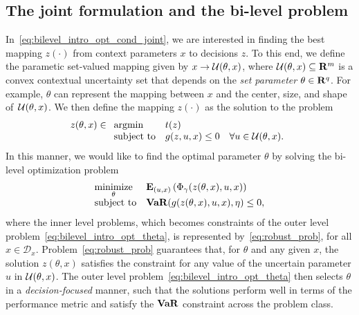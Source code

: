 \subsection{The joint formulation and the bi-level problem}
\label{sec:joint}
In~\eqref{eq:bilevel_intro_opt_cond_joint}, we are interested in finding the best mapping $z(\cdot)$ from context parameters $x$ to decisions $z$. To this end, we define the parametic set-valued mapping given by $x \rightarrow {\mathcal{U}}(\theta,x)$, where 
${\mathcal{U}}(\theta,x) \subseteq {\mathbf R}^m$ is a convex contextual uncertainty set that depends on the {\it set parameter} $\theta \in {\mathbf R}^q$.
For example, $\theta$ can represent the mapping between $x$ and the center, size, and shape of~${\mathcal{U}}(\theta,x)$.
We then define the mapping $z(\cdot)$ as the solution to the  problem
\begin{equation}
	\label{eq:robust_prob}
	z(\theta, x) \in \begin{array}[t]{ll}
		\mbox{argmin}  &t(z)\\
		\mbox{subject to} & g(z,u,x)  \le 0  \quad \forall u \in {\mathcal{U}}(\theta,x).
	\end{array}
\end{equation}
In this manner, we would like to find the optimal parameter $\theta$ by solving the bi-level optimization problem
\begin{equation}
	\label{eq:bilevel_intro_opt_theta}
	\begin{array}{ll}
		\underset{\theta}{\mbox{minimize}} & \mathbf{E}_{(u,x)}\left(\Phi_\gamma(z(\theta,x),u,x)\right) \\
		\mbox{subject to} & \mathop{\bf VaR}(g(z(\theta,x),u,x),\eta) \leq 0,\\
	\end{array}
\end{equation}
where the inner level problems, which becomes constraints of the outer level problem~\eqref{eq:bilevel_intro_opt_theta}, is represented by~\eqref{eq:robust_prob}, for all $x \in \mathcal{D}_x$. 
Problem~\eqref{eq:robust_prob} guarantees that, for $\theta$ and any given $x$, the solution $z(\theta, x)$ satisfies the constraint for any value of the uncertain parameter $u$ in ${\mathcal{U}}(\theta,x)$. The outer level problem~\eqref{eq:bilevel_intro_opt_theta} then selects $\theta$ in a {\it decision-focused} manner, such that the solutions  perform well in terms of the performance metric and satisfy the $\mathop{\bf VaR}$ constraint across the problem class.


